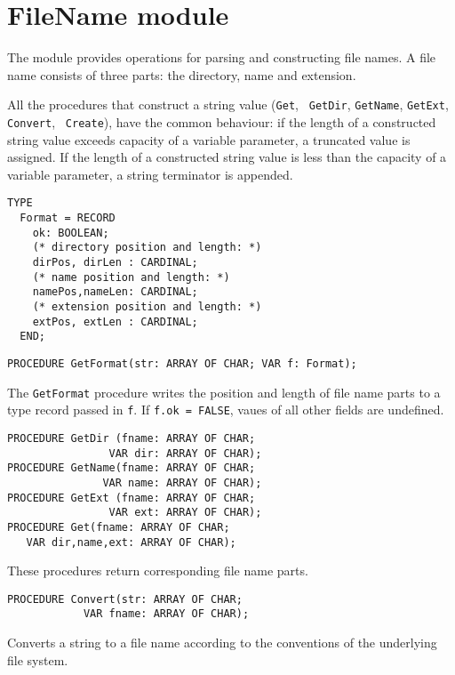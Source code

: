 \section{FileName module}
\renewcommand{\ModuleI}{FileName}
\OneModule

The module provides operations for parsing and constructing file
names. A file name consists of three parts: the directory, name and
extension.

All the procedures that construct a string value ({\tt Get}, {\tt
GetDir},  {\tt GetName}, {\tt GetExt}, {\tt Convert}, {\tt
Create}), have the common behaviour: if the length of a constructed
string value exceeds capacity of a variable parameter, a
truncated value is assigned. If the length of a
constructed string value is less than the capacity of a
variable parameter, a string terminator is appended.

{\samepage
{}
\begin{verbatim}
TYPE
  Format = RECORD
    ok: BOOLEAN;
    (* directory position and length: *)
    dirPos, dirLen : CARDINAL;
    (* name position and length: *)
    namePos,nameLen: CARDINAL;
    (* extension position and length: *)
    extPos, extLen : CARDINAL;
  END;
\end{verbatim}
}
\ModuleList

{\samepage
{}
\begin{verbatim}
PROCEDURE GetFormat(str: ARRAY OF CHAR; VAR f: Format);
\end{verbatim}
}
\ModuleList
The {\tt GetFormat} procedure writes the position and
length of file name parts to a  type
record passed in \verb'f'. If \verb|f.ok = FALSE|,
vaues of all other fields are undefined.

{\samepage
{}
\begin{verbatim}
PROCEDURE GetDir (fname: ARRAY OF CHAR;
                VAR dir: ARRAY OF CHAR);
PROCEDURE GetName(fname: ARRAY OF CHAR;
               VAR name: ARRAY OF CHAR);
PROCEDURE GetExt (fname: ARRAY OF CHAR;
                VAR ext: ARRAY OF CHAR);
PROCEDURE Get(fname: ARRAY OF CHAR;
   VAR dir,name,ext: ARRAY OF CHAR);
\end{verbatim}
}
\ModuleList
These procedures return corresponding file name parts.

{\samepage
{}
\begin{verbatim}
PROCEDURE Convert(str: ARRAY OF CHAR;
            VAR fname: ARRAY OF CHAR);
\end{verbatim}
}
\ModuleList
Converts a string to a file name according to the conventions of the
underlying file system.

